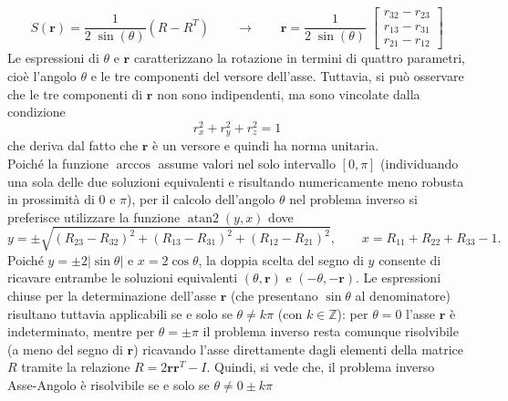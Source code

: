 \documentclass[11pt, a4paper]{report}
\begin{document}
\[
    S(\mathbf{r}) = \frac{1}{2 \; \sin(\theta)} (R - R^{T})
    \qquad\longrightarrow\qquad
    \mathbf{r} = \frac{1}{2 \; \sin(\theta)} \;
    \begin{bmatrix}
        r_{32} - r_{23}\\
        r_{13} - r_{31}\\
        r_{21} - r_{12}
    \end{bmatrix}
\]
Le espressioni di $\theta$ e $\mathbf{r}$ caratterizzano la rotazione in termini di quattro parametri, cioè l'angolo $\theta$ e le tre componenti del versore dell'asse. Tuttavia, si può osservare che le tre componenti di $\mathbf{r}$ non sono indipendenti, ma sono vincolate dalla condizione
\[
    r_{x}^{2} + r_{y}^{2} + r_{z}^{2} = 1
\]
che deriva dal fatto che $\mathbf{r}$ è un versore e quindi ha norma unitaria.\\
Poiché la funzione $\arccos$ assume valori nel solo intervallo $[0, \pi]$ (individuando una sola delle due soluzioni equivalenti e risultando numericamente meno robusta in prossimità di $0$ e $\pi$), per il calcolo dell'angolo $\theta$ nel problema inverso si preferisce utilizzare la funzione $\operatorname{atan2}(y, x)$ dove
\[
    y = \pm \sqrt{(R_{23} - R_{32})^{2} + (R_{13} - R_{31})^{2} + (R_{12} - R_{21})^{2}}, \qquad x = R_{11} + R_{22} + R_{33} - 1.
\]
Poiché $y = \pm 2|\sin\theta|$ e $x = 2\cos\theta$, la doppia scelta del segno di $y$ consente di ricavare entrambe le soluzioni equivalenti $(\theta, \mathbf{r})$ e $(-\theta, -\mathbf{r})$. Le espressioni chiuse per la determinazione dell'asse $\mathbf{r}$ (che presentano $\sin\theta$ al denominatore) risultano tuttavia applicabili se e solo se $\theta \neq k\pi$ (con $k \in \mathbb{Z}$): per $\theta = 0$ l'asse $\mathbf{r}$ è indeterminato, mentre per $\theta = \pm\pi$ il problema inverso resta comunque risolvibile (a meno del segno di $\mathbf{r}$) ricavando l'asse direttamente dagli elementi della matrice $R$ tramite la relazione $R = 2\mathbf{r}\mathbf{r}^T - I$.
Quindi, si vede che, il problema inverso Asse-Angolo è risolvibile se e solo se $\theta \ne 0 \pm k\pi$
\newpage
\end{document}
